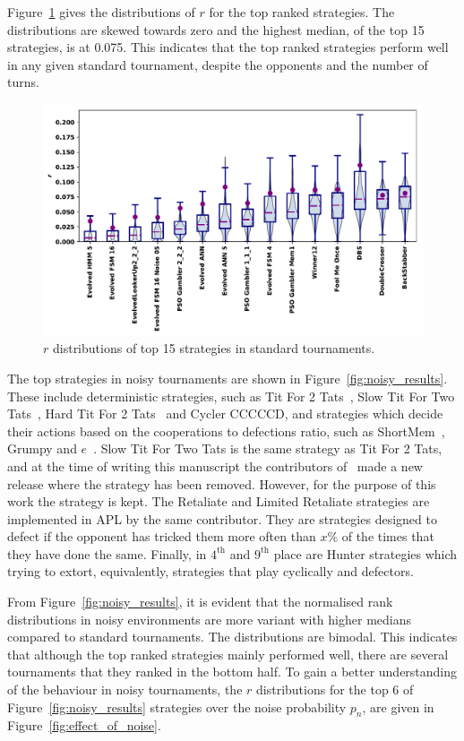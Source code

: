 \documentclass{article}
\begin{document}
Figure~\ref{fig:std_results} gives the distributions of $r$ for the top
ranked strategies. The distributions are skewed towards zero and the highest
median, of the top 15 strategies, is at 0.075. This indicates that the top ranked
strategies perform well in any given standard tournament, despite the opponents and
the number of turns.

\begin{figure}[!htbp]
    \centering
    \includegraphics[width=.7\textwidth]{../images/performance_standard.pdf}
    \caption{$r$ distributions of top 15 strategies in standard tournaments.}\label{fig:std_results}
\end{figure}

The top strategies in noisy tournaments are shown in Figure~\ref{fig:noisy_results}. These include deterministic strategies, such
as Tit For 2 Tats~\cite{Axelrod1980b}, Slow Tit For Two Tats~\cite{axelrodproject}, Hard Tit For 2 Tats~\cite{Stewart2012}
and Cycler CCCCCD, and strategies which decide their actions based on the
cooperations to defections ratio, such as ShortMem~\cite{Carvalho2013}, Grumpy
and $e$~\cite{axelrodproject}. Slow Tit For Two Tats is the same strategy as 
Tit For 2 Tats, and at the time of writing this manuscript the
contributors of~\cite{axelrodproject} made a new release where the strategy
has been removed. However, for the purpose of this work the strategy is kept.
The Retaliate and
Limited Retaliate strategies are implemented in APL by the
same contributor. They are strategies designed to defect if the opponent has
tricked them more often than \(x\%\) of the times that they have
done the same. Finally, in $4^{\text{th}}$ and $9^{\text{th}}$ place are Hunter
strategies which trying to extort, equivalently, strategies that play cyclically
and defectors.

From Figure~\ref{fig:noisy_results}, it is evident that the normalised rank
distributions in noisy environments are more variant with higher medians
compared to standard tournaments. The distributions are bimodal. This indicates
that although the top ranked strategies mainly performed well, there are several
tournaments that they ranked in the bottom half. To gain a better understanding
of the behaviour in noisy tournaments, the \(r\) distributions for the top 6
of Figure~\ref{fig:noisy_results} strategies over the noise probability \(p_n\),
are given in Figure~\ref{fig:effect_of_noise}.
\end{document}
